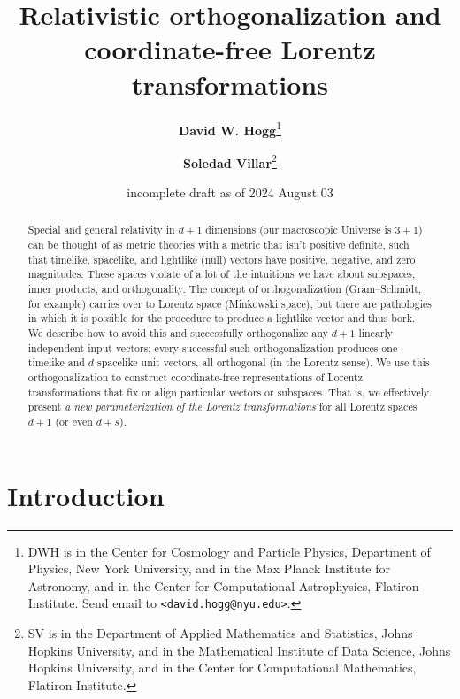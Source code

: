 \documentclass{article}
\title{\bfseries Relativistic orthogonalization and coordinate-free Lorentz transformations}
\author{\textbf{David W. Hogg}\footnote{DWH is in the Center for Cosmology and Particle Physics, Department of Physics, New York University, and in the Max Planck Institute for Astronomy, and in the Center for Computational Astrophysics, Flatiron Institute. Send email to \texttt{<david.hogg@nyu.edu>}.}
        \and
        \textbf{Soledad Villar}\footnote{SV is in the Department of Applied Mathematics and Statistics, Johns Hopkins University, and in the Mathematical Institute of Data Science, Johns Hopkins University, and in the Center for Computational Mathematics, Flatiron Institute.}}
\date{incomplete draft as of 2024 August 03}
\newcommand{\plus}{\!+\!} %
\begin{document}
\thispagestyle{plain}
\maketitle

\begin{abstract}\noindent
    Special and general relativity in $d\plus1$ dimensions (our macroscopic Universe is $3\plus1$) can be thought of as metric theories with a metric that isn't positive definite, such that timelike, spacelike, and lightlike (null) vectors have positive, negative, and zero magnitudes.
    These spaces violate of a lot of the intuitions we have about subspaces, inner products, and orthogonality.
    The concept of orthogonalization (Gram--Schmidt, for example) carries over to Lorentz space (Minkowski space), but there are pathologies in which it is possible for the procedure to produce a lightlike vector and thus bork.
    We describe how to avoid this and successfully orthogonalize any $d+1$ linearly independent input vectors; every successful such orthogonalization produces one timelike and $d$ spacelike unit vectors, all orthogonal (in the Lorentz sense).
    We use this orthogonalization to construct coordinate-free representations of Lorentz transformations that fix or align particular vectors or subspaces.
    That is, we effectively present \emph{a new parameterization of the Lorentz transformations} for all Lorentz spaces $d\plus1$ (or even $d\plus s$).
\end{abstract}

\section{Introduction}\label{sec:intro}
\end{document}
